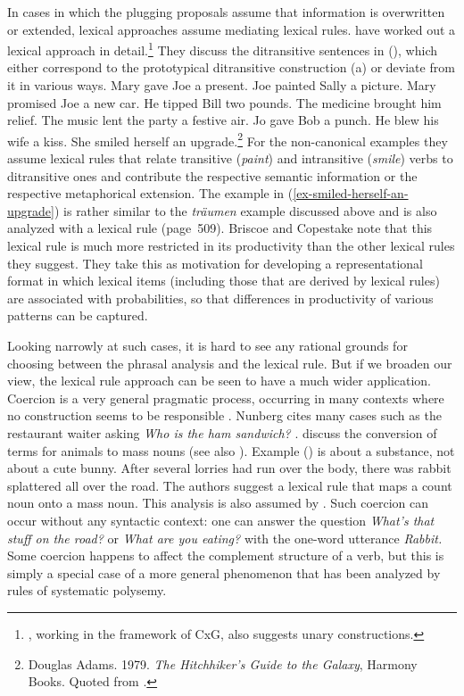 In cases in which the plugging proposals assume that
information is overwritten or extended, lexical approaches assume mediating lexical
rules. \citet[Section~4]{BC99a} have worked out a lexical approach in detail.\footnote{%
\citet{Kay2005a}, working in the framework of CxG, also suggests unary constructions.}
They discuss the ditransitive sentences in (), which either correspond to the prototypical
ditransitive construction (a) or deviate from it in various ways.
\eal
\ex Mary gave Joe a present.
\ex\label{paint} Joe painted Sally a picture.
\ex Mary promised Joe a new car.
\ex He tipped Bill two pounds.
\ex The medicine brought him relief.
\ex The music lent the party a festive air.
\ex Jo gave Bob a punch.
\ex He blew his wife a kiss.
\ex\label{ex-smiled-herself-an-upgrade} She smiled herself an upgrade.\footnote{%
Douglas Adams. 1979. \emph{The Hitchhiker’s Guide to the Galaxy}, Harmony Books. Quoted from
.
}
\zl
For the non-canonical examples they assume lexical rules that relate transitive (\emph{paint}) and intransitive (\emph{smile}) 
verbs to ditransitive ones and contribute the respective semantic information or the respective
metaphorical extension. The example in (\ref{ex-smiled-herself-an-upgrade}) is rather similar to the
\emph{träumen} example discussed above and is also analyzed with a lexical rule (page~509). Briscoe
and Copestake note that this lexical rule is much more restricted in its productivity than the other lexical
rules they suggest. They take this as motivation for developing a representational
format in which lexical items (including those that are derived by lexical rules) are
associated with probabilities, so that differences in productivity of various patterns can be captured.

Looking narrowly at such cases, it is hard to see any rational grounds for choosing between the phrasal analysis and the lexical rule.  But if we broaden our view, the lexical rule approach can be seen to have a much wider application. 
Coercion is a very general pragmatic process, occurring in many contexts where no construction seems
to be responsible  \citep{Nunberg95a-u}.  Nunberg cites many cases such as the restaurant waiter
asking \emph{Who is the ham sandwich?} \citep[]{Nunberg95a-u}.  
\citet[]{CB92a} discuss the conversion of terms for animals to mass nouns (see also \citet[--43]{CB95a-u}). Example () is about a substance, not about a cute bunny.
\ea
After several lorries had run over the body, there was rabbit splattered all over the road.
\z
The authors suggest a lexical rule that maps a count noun onto a mass noun. This analysis is also
assumed by \citet[--115]{Fillmore99a}.
Such coercion can occur without any syntactic context: one can answer the question \emph{What's that
  stuff on the road?} or \emph{What are you eating?} with the one-word utterance \emph{Rabbit.}
Some coercion happens to affect the complement structure of a verb, but this is simply a special
case of a more general phenomenon that has been analyzed by rules of systematic polysemy.      

